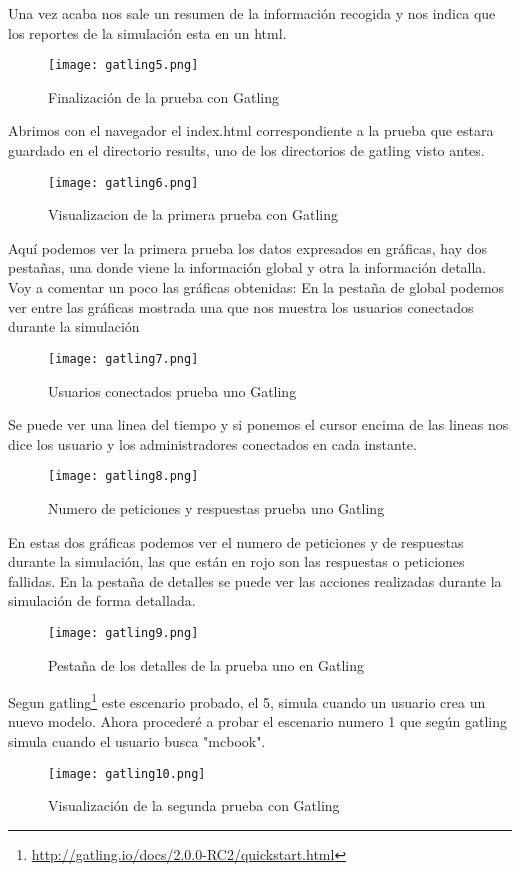 Una vez acaba nos sale un resumen de la información recogida y nos indica que los reportes de la simulación esta en un html.
\begin{figure}[H] 
\centering
\texttt{[image: gatling5.png]}  
\label{figura23:}
\caption{Finalización de la prueba con Gatling}
\end{figure}
Abrimos con el navegador el index.html correspondiente a la prueba que estara guardado en el directorio results, uno de los directorios de gatling visto antes.
\begin{figure}[H] 
\centering
\texttt{[image: gatling6.png]}  
\label{figura24:}
\caption{Visualizacion de la primera prueba con Gatling}
\end{figure}
Aquí podemos ver la primera prueba los datos expresados en gráficas, hay dos pestañas, una donde viene la información global y otra la información detalla. Voy a comentar un poco las gráficas obtenidas:
En la pestaña de global podemos ver entre las gráficas mostrada una que nos muestra los usuarios conectados durante la simulación
\begin{figure}[H] 
\centering
\texttt{[image: gatling7.png]}  
\label{figura25:}
\caption{Usuarios conectados prueba uno Gatling}
\end{figure}
Se puede ver una linea del tiempo y si ponemos el cursor encima de las lineas nos dice los usuario y los administradores conectados en cada instante.
\begin{figure}[H] 
\centering
\texttt{[image: gatling8.png]}  
\label{figura26:}
\caption{Numero de peticiones y respuestas prueba uno Gatling}
\end{figure}
En estas dos gráficas podemos ver el numero de peticiones y de respuestas durante la simulación, las que están en rojo son las respuestas o peticiones fallidas.
En la pestaña de detalles se puede ver las acciones realizadas durante la simulación de forma detallada.
\begin{figure}[H] 
\centering
\texttt{[image: gatling9.png]}  
\label{figura27:}
\caption{Pestaña de los detalles de la prueba uno en Gatling}
\end{figure}
Segun gatling\footnote{\url{http://gatling.io/docs/2.0.0-RC2/quickstart.html}} este escenario probado, el 5, simula cuando un usuario crea un nuevo modelo. Ahora procederé a probar el escenario numero 1 que según gatling simula cuando el usuario busca "mcbook".
\begin{figure}[H] 
\centering
\texttt{[image: gatling10.png]}  
\label{figura28:}
\caption{Visualización de la segunda prueba con Gatling}
\end{figure}
